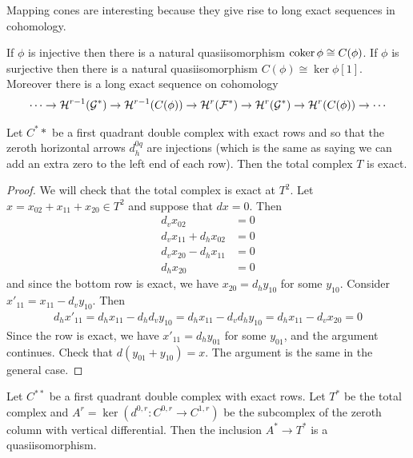 Mapping cones are interesting because they give rise to long exact sequences in cohomology.
\begin{lemma}
    If $\phi$ is injective then there is a natural quasiisomorphism $\operatorname{coker}\phi\cong C(\phi)$.
    If $\phi$ is surjective then there is a natural quasiisomorphism $C(\phi)\cong \ker\phi[1]$.
    Moreover there is a long exact sequence on cohomology \begin{align*}
        \cdots \to {\mathcal{H}}^{r-1}({\mathcal{G}}^*) \to {\mathcal{H}}^{r-1}(C(\phi)) \to {\mathcal{H}}^r({\mathcal{F}}^*) \to {\mathcal{H}}^r({\mathcal{G}}^*) \to {\mathcal{H}}^r(C(\phi)) \to \cdots
    \end{align*}
\end{lemma}

\begin{lemma}
    Let $C^**$ be a first quadrant double complex with exact rows and so that the zeroth
    horizontal arrows $d_h^{0q}$ are injections (which is the same as saying we 
    can add an extra zero to the left end of each row). Then the total complex
    $T$ is exact.
\end{lemma}

\begin{proof}
    We will check that the total complex is exact at $T^2$. Let $x = x_{02} + x_{11} + x_{20} \in T^2$
    and suppose that $dx = 0$. Then \begin{align*}
        d_v x_{02} &= 0 \\
        d_vx_{11} + d_hx_{02} &= 0 \\
        d_vx_{20} - d_hx_{11} &= 0 \\
        d_hx_{20} &= 0
    \end{align*} and since the bottom row is exact, we have $x_{20} = d_hy_{10}$ for some $y_{10}$.
    Consider $x'_{11} = x_{11} - d_vy_{10}$. Then \begin{align*}
        d_hx'_{11} = d_hx_{11} - d_hd_vy_{10} = d_hx_{11} - d_vd_hy_{10} = d_hx_{11} - d_vx_{20} = 0
    \end{align*} Since the row is exact, we have $x'_{11} = d_hy_{01}$ for some $y_{01}$,
    and the argument continues. Check that $d(y_{01} + y_{10}) = x$. The 
    argument is the same in the general case. 
\end{proof}

\begin{corollary}
    Let $C^{**}$ be a first quadrant double complex with exact rows. Let $T^*$
    be the total complex and $A^r = \ker(d^{0,r}:C^{0,r}\to C^{1,r})$ be the subcomplex of the zeroth 
    column with vertical differential. Then the inclusion $A^* \to T^*$ is a quasiisomorphism.
\end{corollary}

